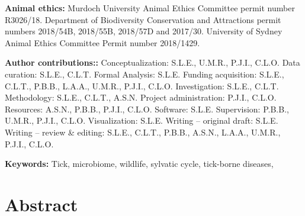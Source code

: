 \documentclass[a4paper, nobind]{templates/ociamthesis}
\begin{document}
\vspace{5mm}

\textbf{Animal ethics:} Murdoch University Animal Ethics Committee permit number R3026/18. Department of Biodiversity Conservation and Attractions permit numbers 2018/54B, 2018/55B, 2018/57D and 2017/30. University of Sydney Animal Ethics Committee Permit number 2018/1429.

\vspace{5mm}

\textbf{Author contributions::}
Conceptualization: S.L.E., U.M.R., P.J.I., C.L.O.
Data curation: S.L.E., C.L.T.
Formal Analysis: S.L.E.
Funding acquisition: S.L.E., C.L.T., P.B.B., L.A.A., U.M.R., P.J.I., C.L.O.
Investigation: S.L.E., C.L.T.
Methodology: S.L.E., C.L.T., A.S.N.
Project administration: P.J.I., C.L.O.
Resources: A.S.N., P.B.B., P.J.I., C.L.O.
Software: S.L.E.
Supervision: P.B.B., U.M.R., P.J.I., C.L.O.
Visualization: S.L.E.
Writing -- original draft: S.L.E.
Writing -- review \& editing: S.L.E., C.L.T., P.B.B., A.S.N., L.A.A., U.M.R., P.J.I., C.L.O.

\vspace{5mm}

\textbf{Keywords:} Tick, microbiome, wildlife, sylvatic cycle, tick-borne diseases,

\newpage

\hypertarget{abstract-1}{%
\section{Abstract}\label{abstract-1}}
\end{document}
